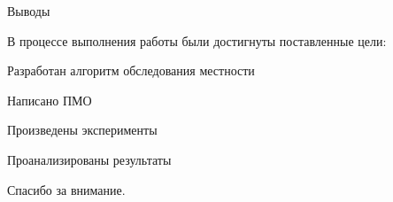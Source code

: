 \begin{tslide}{Выводы}

    В процессе выполнения работы были достигнуты поставленные цели:
    \begin{mintemize}
    \item Разработан алгоритм обследования местности
    \item Написано ПМО
    \item Произведены эксперименты
    \item Проанализированы результаты
    \end{mintemize}

\end{tslide}

\begin{cslide}
    \LARGE Спасибо за внимание.
\end{cslide}


